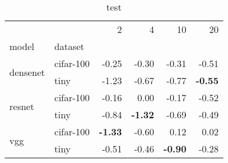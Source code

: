 \begin{table}
\caption{test}
\begin{tabular}{llrrrr}
\toprule
 &  & 2 & 4 & 10 & 20 \\
model & dataset &  &  &  &  \\
\midrule
\multirow[c]{2}{*}{densenet} & cifar-100 & -0.25 & -0.30 & -0.31 & -0.51 \\
 & tiny & -1.23 & -0.67 & -0.77 & \color{red} \bfseries -0.55 \\
\multirow[c]{2}{*}{resnet} & cifar-100 & -0.16 & 0.00 & -0.17 & -0.52 \\
 & tiny & -0.84 & \color{red} \bfseries -1.32 & -0.69 & -0.49 \\
\multirow[c]{2}{*}{vgg} & cifar-100 & \color{red} \bfseries -1.33 & -0.60 & 0.12 & 0.02 \\
 & tiny & -0.51 & -0.46 & \color{red} \bfseries -0.90 & -0.28 \\
\bottomrule
\end{tabular}
\end{table}
